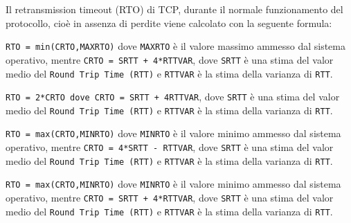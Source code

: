 \question
Il retransmission timeout (RTO) di TCP, durante il normale funzionamento del protocollo, cioè in assenza di perdite viene calcolato con la seguente formula:

\begin{checkboxes}
	\choice \texttt{RTO = min(CRTO,MAXRTO)} dove \texttt{MAXRTO} è il valore massimo ammesso dal sistema operativo, mentre \texttt{CRTO = SRTT + 4*RTTVAR}, dove \texttt{SRTT} è una stima del valor medio del \texttt{Round Trip Time (RTT)} e \texttt{RTTVAR} è la stima della varianza di \texttt{RTT}.

	\choice \texttt{RTO = 2*CRTO dove CRTO = SRTT + 4RTTVAR}, dove \texttt{SRTT} è una stima del valor medio del \texttt{Round Trip Time (RTT)} e \texttt{RTTVAR} è la stima della varianza di \texttt{RTT}.

	\choice \texttt{RTO = max(CRTO,MINRTO)} dove \texttt{MINRTO} è il valore minimo ammesso dal sistema operativo, mentre \texttt{CRTO = 4*SRTT - RTTVAR}, dove \texttt{SRTT} è una stima del valor medio del \texttt{Round Trip Time (RTT)} e \texttt{RTTVAR} è la stima della varianza di \texttt{RTT}.

	\CorrectChoice \texttt{RTO = max(CRTO,MINRTO)} dove \texttt{MINRTO} è il valore minimo ammesso dal sistema operativo, mentre \texttt{CRTO = SRTT + 4*RTTVAR}, dove \texttt{SRTT} è una stima del valor medio del \texttt{Round Trip Time (RTT)} e \texttt{RTTVAR} è la stima della varianza di \texttt{RTT}.
\end{checkboxes}
